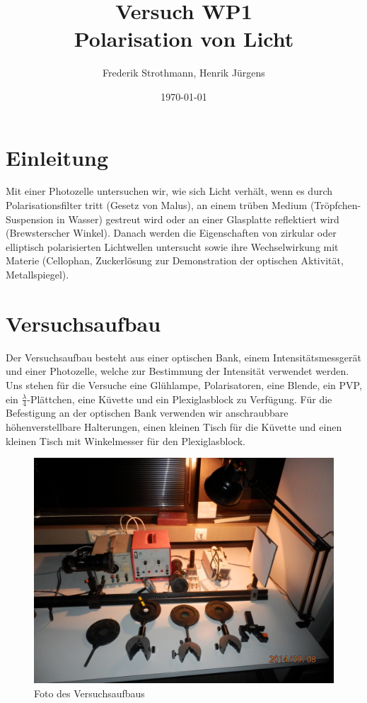 \documentclass[12pt]{scrartcl}
\title{Versuch WP1\\ Polarisation von Licht}
\author{Frederik Strothmann, Henrik Jürgens}
\date{\today}
\begin{document}

\maketitle
\tableofcontents
\newpage


\section{Einleitung}
Mit einer Photozelle untersuchen wir, wie sich Licht verhält, wenn es durch Polarisationsfilter tritt (Gesetz von Malus), an einem trüben Medium (Tröpfchen-Suspension in Wasser) gestreut wird oder an einer Glasplatte reflektiert wird (Brewsterscher Winkel).
Danach werden die Eigenschaften von zirkular oder elliptisch polarisierten Lichtwellen untersucht sowie ihre Wechselwirkung mit Materie (Cellophan, Zuckerlösung zur Demonstration der optischen Aktivität, Metallspiegel). 


\section{Versuchsaufbau}
Der Versuchsaufbau besteht aus einer optischen Bank, einem Intensitätsmessgerät und einer Photozelle, welche zur Bestimmung der Intensität verwendet werden. Uns stehen für die Versuche eine Glühlampe, Polarisatoren, eine Blende, ein PVP, ein $\frac{\lambda}{4}$-Plättchen, eine Küvette und ein Plexiglasblock zu Verfügung. Für die Befestigung an der optischen Bank verwenden wir anschraubbare höhenverstellbare Halterungen, einen kleinen Tisch für die Küvette und einen kleinen Tisch mit Winkelmesser für den Plexiglasblock.

\begin{figure}[H]
\centering
    \includegraphics[scale = 0.1]{aufbau.JPG}
  	\caption[Foto des Versuchsaufbaus]{Foto des Versuchsaufbaus}
  \label{fig:a_1}
\end{figure}
\end{document}
